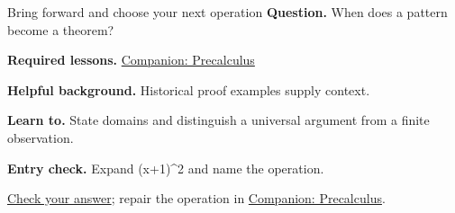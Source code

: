 \begin{learningcard}{Bring forward and choose your next operation}
\textsf{\textbf{Question.}} When does a pattern become a theorem?\par
\textbf{Required lessons.} \href{https://github.com/Oichkatzelesfrettschen/precalc_paper}{Companion: Precalculus}\par
\textbf{Helpful background.} Historical proof examples supply context.\par
\textbf{Learn to.} State domains and distinguish a universal argument from a finite observation.\par
\textbf{Entry check.} Expand (x+1)\textasciicircum{}2 and name the operation.\par
\hyperref[solution:entry:proof]{Check your answer}; repair the operation in \href{https://github.com/Oichkatzelesfrettschen/precalc_paper}{Companion: Precalculus}.
\end{learningcard}
